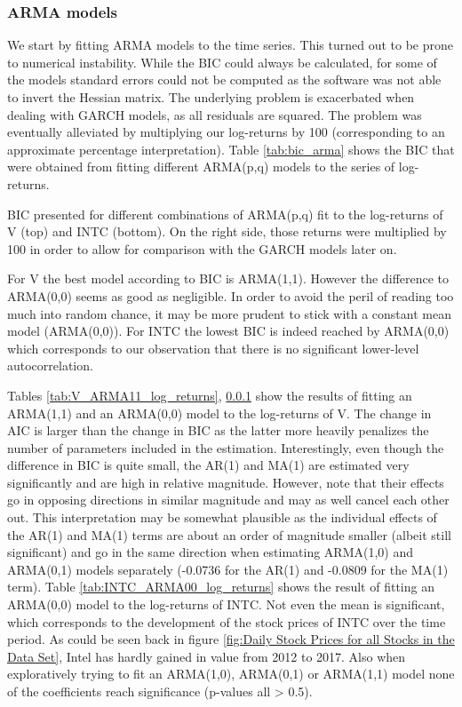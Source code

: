 \subsubsection{ARMA models}
We start by fitting ARMA models to the time series. This turned out to be prone to numerical instability. While the BIC could always be calculated, for some of the models standard errors could not be computed as the software was not able to invert the Hessian matrix. The underlying problem is exacerbated when dealing with GARCH models, as all residuals are squared. The problem was eventually alleviated by multiplying our log-returns by 100 (corresponding to an approximate percentage interpretation). Table \ref{tab:bic_arma} shows the BIC that were obtained from fitting different ARMA(p,q) models to the series of log-returns. 

\begin{table}
    \centering
    
    \caption{BIC presented for different combinations of ARMA(p,q) fit to the log-returns of V (top) and INTC (bottom). On the right side, those returns were multiplied by 100 in order to allow for comparison with the GARCH models later on.}
    \label{tab:bic_arma}
\end{table}{}

For V the best model according to BIC is ARMA(1,1). However the difference to ARMA(0,0) seems as good as negligible. In order to avoid the peril of reading too much into random chance, it may be more prudent to stick with a constant mean model (ARMA(0,0)). For INTC the lowest BIC is indeed reached by ARMA(0,0) which corresponds to our observation that there is no significant lower-level autocorrelation. 

Tables \ref{tab:V_ARMA11_log_returns}, \ref{} show the results of fitting an  ARMA(1,1) and an ARMA(0,0) model to the log-returns of V. The change in AIC is larger than the change in BIC as the latter more heavily penalizes the number of parameters included in the estimation. Interestingly, even though the difference in BIC is quite small, the AR(1) and MA(1) are estimated very significantly and are high in relative magnitude. However, note that their effects go in opposing directions in similar magnitude and may as well cancel each other out. This interpretation may be somewhat plausible as the individual effects of the AR(1) and MA(1) terms are about an order of magnitude smaller (albeit still significant) and go in the same direction when estimating ARMA(1,0) and ARMA(0,1) models separately (-0.0736 for the AR(1) and -0.0809 for the MA(1) term).
Table \ref{tab:INTC_ARMA00_log_returns} shows the result of fitting an ARMA(0,0) model to the log-returns of INTC. Not even the mean is significant, which corresponds to the development of the stock prices of INTC over the time period. As could be seen back in figure \ref{fig:Daily Stock Prices for all Stocks in the Data Set}, Intel has hardly gained in value from 2012 to 2017. Also when exploratively trying to fit an ARMA(1,0), ARMA(0,1) or ARMA(1,1) model none of the coefficients reach significance (p-values all > 0.5). 

